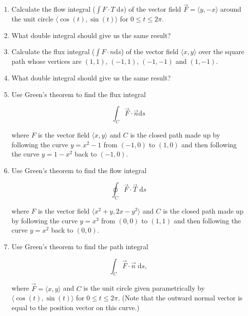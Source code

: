 \documentclass{amsart}
\newcommand{\ds}{\;\mbox{d}s}
\begin{document}
\begin{enumerate}

\item Calculate the flow integral ($\int F \cdot T \ds$) of the
vector field $\vec{F} = \langle y, -x \rangle$ around the unit circle
$\langle \cos{(t)}, \sin{(t)} \rangle$ for $0 \leq t \leq 2\pi$.

\vfill

\vfill

\item What double integral should give us the same result?

\vfill

\newpage

\item Calculate the flux integral ($\int F \cdot n \mbox{d}s$) of the 
vector field $\langle x, y \rangle$ over the square path whose vertices
are $(1,1)$, $(-1,1)$, $(-1,-1)$ and $(1,-1)$. 

\vfill

\vfill

\item What double integral should give us the same result?

\vfill

\newpage

\item Use Green's theorem to find the flux integral 

\[ \int_C \vec{F} \cdot \vec{n} \mbox{d}s \]

\noindent where $F$ is the vector field $\langle x, y \rangle$ and $C$
is the closed path made up by following the curve $y=x^2-1$ from
$(-1,0)$ to $(1,0)$ and then following the curve $y = 1 - x^2$ back to
$(-1,0)$.


\newpage

\item Use Green's theorem to find the flow integral 

\[ \oint_C \vec{F} \cdot \vec{T} \ds \]

\noindent where $F$ is the vector field $\langle x^2+y, 2x-y^2 \rangle$ and $C$
is the closed path made up by following the curve $y=x^3$ from
$(0,0)$ to $(1,1)$ and then following the curve $y = x^2$ back to
$(0,0)$. 


\newpage


\item Use Green's theorem to find the path integral 

\[ \int_C \vec{F} \cdot \vec{n} \; \mbox{d}s, \]

where $\vec{F} = \langle x, y \rangle$ and $C$ is the unit circle 
given parametrically by $\langle \cos{(t)}, \sin{(t)} \rangle$ for
$0 \leq t \leq 2\pi$.  (Note that the outward normal vector is equal to the
position vector on this curve.)

\vfill

\end{enumerate}
\end{document}
